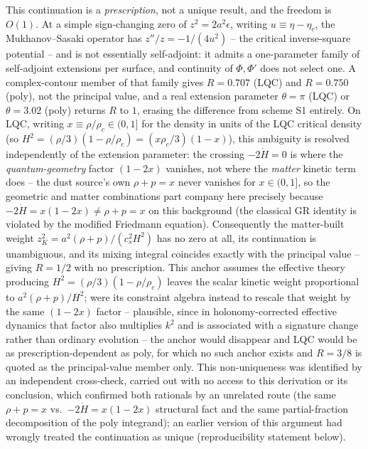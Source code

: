 \documentclass[aps,prd,twocolumn,superscriptaddress,nofootinbib,longbibliography]{revtex4-2}
\begin{document}
This continuation is a \emph{prescription}, not a unique result, and the
freedom is $O(1)$. At a simple sign-changing zero of $z^2=2a^2\epsilon$,
writing $u\equiv\eta-\eta_c$, the Mukhanov--Sasaki operator has
$z''/z=-1/(4u^2)$ -- the critical inverse-square potential -- and is not
essentially self-adjoint: it admits a one-parameter family of
self-adjoint extensions per surface, and continuity of $\Phi,\Phi'$ does
not select one. A complex-contour member of that family gives $R=0.707$
(LQC) and $R=0.750$ (poly), not the principal value, and a real extension
parameter $\theta=\pi$ (LQC) or $\theta=3.02$ (poly) returns $R$ to $1$,
erasing the difference from scheme S1 entirely. On LQC, writing
$x\equiv\rho/\rho_c\in(0,1]$ for the density in units of the LQC critical
density (so $H^2=(\rho/3)(1-\rho/\rho_c)=(x\rho_c/3)(1-x)$), this ambiguity
is resolved independently of the extension parameter: the crossing
$-2\dot H=0$ is where the \emph{quantum-geometry} factor $(1-2x)$ vanishes,
not where the \emph{matter} kinetic term does -- the dust source's own
$\rho+p=x$ never vanishes for $x\in(0,1]$, so the geometric and matter
combinations part company here precisely because $-2\dot H=x(1-2x)\neq
\rho+p=x$ on this background (the classical GR identity is violated by the
modified Friedmann equation). Consequently the
matter-built weight $z_K^2=a^2(\rho+p)/(c_s^2H^2)$ has no zero at all,
its continuation is unambiguous, and its mixing integral coincides
exactly with the principal value -- giving $R=1/2$ with no prescription.
This anchor assumes the effective theory producing
$H^2=(\rho/3)(1-\rho/\rho_c)$ leaves the scalar kinetic weight
proportional to $a^2(\rho+p)/H^2$; were its constraint algebra instead to
rescale that weight by the same $(1-2x)$ factor -- plausible, since in
holonomy-corrected effective dynamics that factor also multiplies $k^2$
and is associated with a signature change rather than ordinary evolution
-- the anchor would disappear and LQC would be as prescription-dependent
as poly, for which no such anchor exists and $R=3/8$ is quoted as the
principal-value member only. This non-uniqueness was identified by an
independent cross-check, carried out with no access to this derivation
or its conclusion, which confirmed both rationals by an unrelated route
(the same $\rho+p=x$ vs.\ $-2\dot H=x(1-2x)$ structural fact and the same
partial-fraction decomposition of the poly integrand); an earlier version
of this argument had wrongly treated the continuation as unique
(reproducibility statement below).
\end{document}
